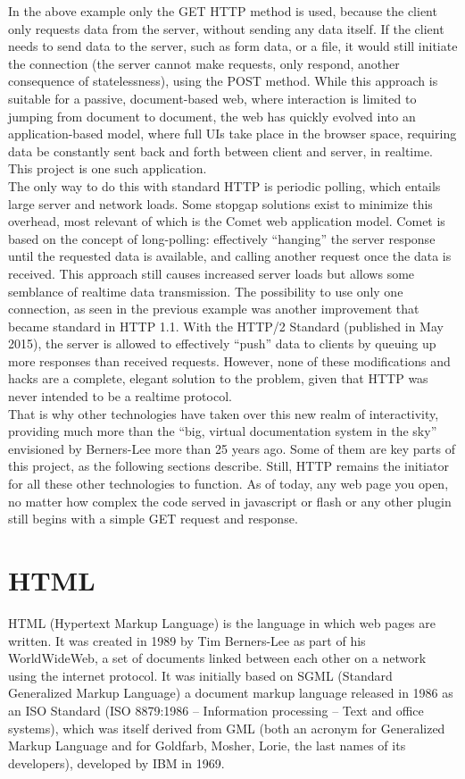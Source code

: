 In the above example only the GET HTTP method is used, because the client only requests data from the server, without
sending any data itself. If the client needs to send data to the server, such as form data, or a file, it would still
initiate the connection (the server cannot make requests, only respond, another consequence of statelessness), using
the POST method. While this approach is suitable for a passive, document-based web, where interaction is limited to
jumping from document to document, the web has quickly evolved into an application-based model, where full UIs take
place in the browser space, requiring data be constantly sent back and forth between client and server, in realtime.
This project is one such application.\\

The only way to do this with standard HTTP is periodic polling, which entails large server and network loads. Some
stopgap solutions exist to minimize this overhead, most relevant of which is the Comet web application model. Comet is
based on the concept of long-polling: effectively ``hanging'' the server response until the requested data is
available, and calling another request once the data is received. This approach  still causes increased server loads
but allows some semblance of realtime data transmission. The possibility to use only one connection, as seen in the
previous example was another improvement that became standard in HTTP 1.1. With the HTTP/2 Standard (published in May
2015), the server is allowed to effectively ``push'' data to clients by queuing up more responses than received
requests. However, none of these modifications and hacks are a complete, elegant solution to the problem, given that
HTTP was never intended to be a realtime protocol.\\

That is why other technologies have taken over this new realm of interactivity, providing much more than the ``big,
virtual documentation system in the sky'' \cite{bernerslee09} envisioned by Berners-Lee more than 25 years ago. Some
of them are key parts of this project, as the following sections describe. Still, HTTP remains the initiator for all
these other technologies to function. As of today, any web page you open, no matter how complex the code served in
javascript or flash or any other plugin still begins with a simple GET request and response.
\section{HTML}
HTML (Hypertext Markup Language) is the language in which web pages are written. It was created in 1989 by Tim
Berners-Lee as part of his WorldWideWeb, a set of documents linked between each other on a network using the internet
protocol. It was initially based on SGML (Standard Generalized Markup Language) a document markup language released in
1986 as an ISO Standard (ISO 8879:1986 -- Information processing -- Text and office systems), which was itself derived
from GML (both an acronym for Generalized Markup Language and for Goldfarb, Mosher, Lorie, the last names of its
developers), developed by IBM in 1969.\\


